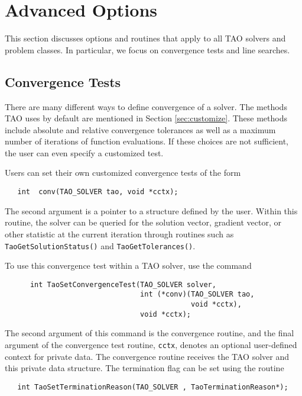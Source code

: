 
\chapter{Advanced Options}

This section discusses options and routines that apply to all TAO
solvers and problem classes.  In particular, we focus on
convergence tests and line searches.



\section{Convergence Tests}
\label{sec:Taoconvergence}

There are many different ways to define convergence of a solver.
The methods TAO uses by default are mentioned in 
Section \ref{sec:customize}.
These methods include absolute and relative convergence tolerances as well
as a maximum number of iterations of function evaluations.
If these choices are not sufficient, 
the user can even specify a customized test. 

Users can set their own customized convergence tests of the form
\begin{verbatim}
   int  conv(TAO_SOLVER tao, void *cctx);
\end{verbatim}
\noindent
The second argument
is a pointer to a structure defined by the user.
Within this routine, the solver
can be queried for the solution vector, gradient vector,
or other statistic at the current iteration through routines such as
{\tt TaoGetSolutionStatus()} and  {\tt TaoGetTolerances()}.

To use this convergence test within a TAO solver, use
the command 
\begin{verbatim}
      int TaoSetConvergenceTest(TAO_SOLVER solver,
                                int (*conv)(TAO_SOLVER tao,
                                            void *cctx),
                                void *cctx);
\end{verbatim}
\noindent
The second argument of this command is the convergence routine, and the
final argument of the convergence test routine, {\tt cctx},
denotes an optional user-defined context for private data.  
The convergence routine receives the TAO solver and this private data
structure. 
The termination flag can be set using the routine
\begin{verbatim}
   int TaoSetTerminationReason(TAO_SOLVER , TaoTerminationReason*);
\end{verbatim}
\noindent



